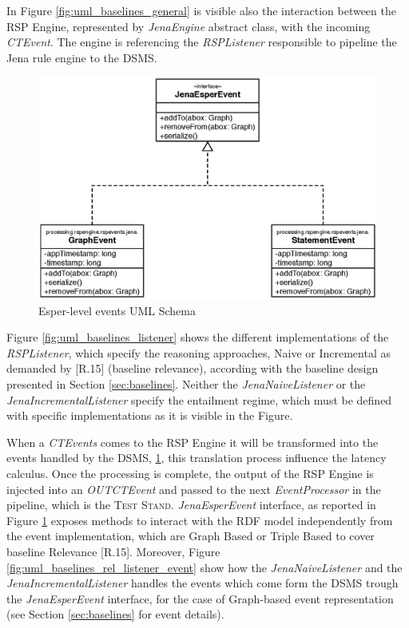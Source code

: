 In Figure \ref{fig:uml_baselines_general} is visible also the interaction between  the RSP Engine, represented by \textit{JenaEngine} abstract class, with the incoming \textit{CTEvent}. The engine is referencing the \textit{RSPListener} responsible to pipeline the Jena rule engine to the DSMS. 

\begin{figure}[tbh]
  \centering
	\includegraphics[width=0.5\linewidth]{images/uml_baselines_events}
	\caption{Esper-level events UML Schema} 
  	\label{fig:uml_baselines_events}
\end{figure}

Figure \ref{fig:uml_baselines_listener} shows the different implementations of the \textit{RSPListener}, which specify the reasoning approaches, Naive or Incremental as demanded by [R.15] (baseline relevance), according with the baseline design presented in Section \ref{sec:baselines}. Neither the \textit{JenaNaiveListener} or the \textit{JenaIncrementalListener} specify the entailment regime, which must be defined with specific implementations as it is visible in the Figure.



When a \textit{CTEvents} comes to the RSP Engine it will be transformed into the events handled by the DSMS, \ref{fig:uml_baselines_events}, this translation process influence the latency calculus. Once the processing is complete, the output of the RSP Engine is injected into an \textit{OUTCTEvent} and passed to the next \textit{EventProcessor} in the pipeline, which is the \textsc{Test Stand}. \textit{JenaEsperEvent} interface, as reported in Figure \ref{fig:uml_baselines_events} exposes methods to interact with the RDF model independently from the event implementation, which are Graph Based or Triple Based to cover baseline Relevance [R.15]. Moreover, Figure \ref{fig:uml_baselines_rel_listener_event} show how the \textit{JenaNaiveListener} and the  \textit{JenaIncrementalListener} handles the events which come form the DSMS trough the \textit{JenaEsperEvent} interface, for the case of Graph-based event representation (see Section \ref{sec:baselines} for event details). 

